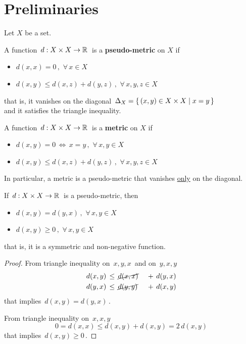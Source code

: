 \documentclass[./main.tex]{subfiles}
\begin{document}
\ifSubfilesClassLoaded{\mainmatter}{}

\chapter{Preliminaries} \label{chap:p2c1}

Let $X$ be a set.

\begin{definition}
    A function $\, d : {X \times X} \to \mathbb{R} \,$ is a \textbf{pseudo-metric} on $X$ if
    \begin{itemize}
        \item $d(x,x) = 0 \,,$                  \tabto*{15em} $\forall\, x \in X$
        \item $d(x,y) \leq d(x,z) + d(y,z) \,,$ \tabto*{15em} $\forall\, x,y,z \in X$
    \end{itemize}
    that is, it vanishes on the diagonal $\, \Delta_X = \{\, (x,y) \in {X \times X} \mathrel{|} x = y \,\} \,$ \\
    and it satisfies the triangle inequality.
\end{definition}

\begin{definition}[metric]
    A function $\, d : {X \times X} \to \mathbb{R} \,$ is a \textbf{metric} on $X$ if
    \begin{itemize}
        \item $d(x,y) = 0 \,\iff\, x = y \,,$   \tabto*{15em} $\forall\, x,y \in X$
        \item $d(x,y) \leq d(x,z) + d(y,z) \,,$ \tabto*{15em} $\forall\, x,y,z \in X$
    \end{itemize}
    In particular, a metric is a pseudo-metric that vanishes \underline{only} on the diagonal.
\end{definition}

\clearpage

\begin{proposition}
    If $\, d : {X \times X} \to \mathbb{R} \,$ is a pseudo-metric, then
    \begin{itemize}
        \item $d(x,y) = d(y,x) \,,$  \tabto*{10em} $\forall\, x,y \in X$
        \item $d(x,y) \geq 0 \,,$    \tabto*{10em} $\forall\, x,y \in X$
    \end{itemize}
    that is, it is a symmetric and non-negative function.
\end{proposition}
\begin{proof}
    From triangle inequality on $\, x,y,x \,$ and on $\, y,x,y \,$
    \begin{alignat*}{2}
        d(x,y) &\,\leq\, \cancel{d(x,x)} &&\,+\, d(y,x) \\
        d(y,x) &\,\leq\, \cancel{d(y,y)} &&\,+\, d(x,y)
    \end{alignat*}
    that implies $\, d(x,y) = d(y,x) \,$.\bigskip

    From triangle inequality on $\, x,x,y \,$
    \[ 0 = d(x,x) \leq d(x,y) + d(x,y) = 2\,d(x,y) \]
    that implies $\, d(x,y) \geq 0 \,$.
\end{proof}
\end{document}
